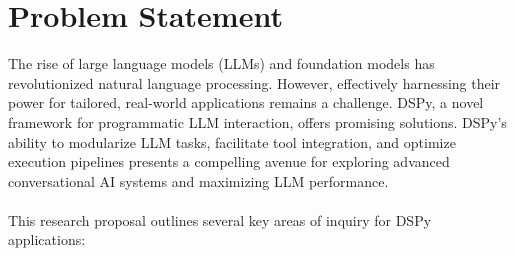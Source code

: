 \section{Problem Statement}

The rise of large language models (LLMs) and foundation models has revolutionized natural language processing. However, effectively harnessing their power for tailored, real-world applications remains a challenge. DSPy, a novel framework for programmatic LLM interaction, offers promising solutions. DSPy's ability to modularize LLM tasks, facilitate tool integration, and optimize execution pipelines presents a compelling avenue for exploring advanced conversational AI systems and maximizing LLM performance. \\
\\
This research proposal outlines several key areas of inquiry for DSPy applications:


